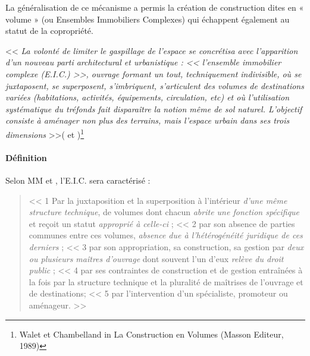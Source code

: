 				La généralisation de ce mécanisme a permis la création de construction dites en « volume » (ou Ensembles
				Immobiliers Complexes) qui échappent également au statut de la copropriété.
				
				<< \emph{La volonté de limiter le gaspillage de l'espace se concrétisa avec l'apparition d'un nouveau parti
				architectural et urbanistique : << \emph{l'ensemble immobilier complexe (E.I.C.)} >>, ouvrage formant un tout,
				techniquement indivisible, où se juxtaposent, se superposent, s'imbriquent, s'articulent des volumes de
				destinations variées (habitations, activités, équipements, circulation, etc) et où l'utilisation systématique
				du tréfonds fait disparaître la notion même de sol naturel. L'objectif consiste à aménager non plus des
				terrains, mais l'espace urbain dans ses trois dimensions} >>( et )\footnote{
				Walet et Chambelland in La Construction en Volumes (Masson Editeur, 1989)}
				
			\paragraph{Définition}
				Selon MM  et , l'E.I.C. sera caractérisé :
				\begin{quote}
					<< 1\degre{} Par la juxtaposition et la superposition à l'intérieur \emph{d'une même structure technique},
					de volumes dont chacun \emph{abrite une fonction spécifique} et reçoit un statut \emph{approprié à
					celle-ci} ;
					<< 2\degre{} par son absence de parties communes entre ces volumes, \emph{absence due à
					l'hétérogénéité juridique de ces derniers} ;
					<< 3\degre{} par son appropriation, sa construction, sa gestion par \emph{deux ou plusieurs maîtres
					d'ouvrage} dont souvent l'un d'eux \emph{relève du droit public} ;
					<< 4\degre{} par ses contraintes de construction et de gestion entraînées à la fois par la structure
					technique et la pluralité de maîtrises de l'ouvrage et de destinations;
					<< 5\degre{} par l'intervention d'un spécialiste, promoteur ou aménageur. >>
				\end{quote}
			
